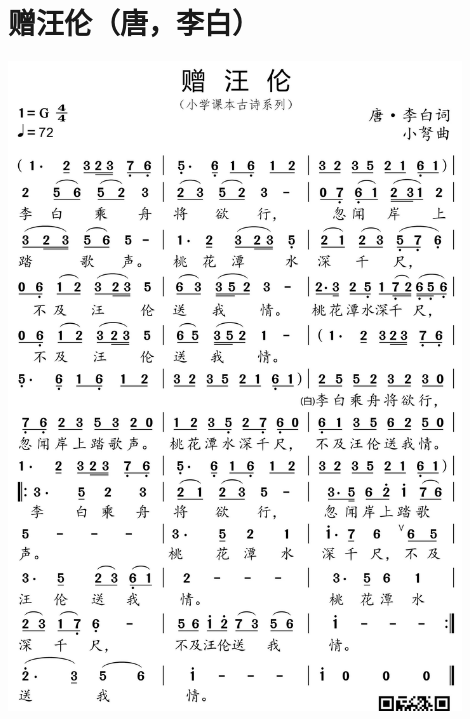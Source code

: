 \documentclass[cn,pad,chinesefont=nofont]{elegantbook}
\begin{document}
\section{赠汪伦（唐，李白）}
    \includegraphics[width=0.9\textwidth]{dongxiao/20200627-古诗-赠汪伦.jpg}   
\end{document}
